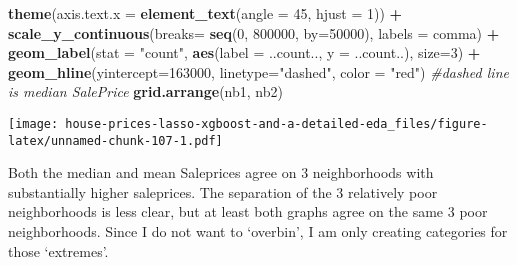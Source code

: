 \documentclass[]{article}
\newenvironment{Shaded}{\begin{snugshade}}{\end{snugshade}}
\newcommand{\KeywordTok}[1]{\textcolor[rgb]{0.13,0.29,0.53}{\textbf{#1}}}
\newcommand{\DataTypeTok}[1]{\textcolor[rgb]{0.13,0.29,0.53}{#1}}
\newcommand{\DecValTok}[1]{\textcolor[rgb]{0.00,0.00,0.81}{#1}}
\newcommand{\StringTok}[1]{\textcolor[rgb]{0.31,0.60,0.02}{#1}}
\newcommand{\CommentTok}[1]{\textcolor[rgb]{0.56,0.35,0.01}{\textit{#1}}}
\newcommand{\OperatorTok}[1]{\textcolor[rgb]{0.81,0.36,0.00}{\textbf{#1}}}
\newcommand{\NormalTok}[1]{#1}
\begin{document}
\begin{Shaded}
\begin{Highlighting}[]
\StringTok{        }\KeywordTok{theme}\NormalTok{(}\DataTypeTok{axis.text.x =} \KeywordTok{element_text}\NormalTok{(}\DataTypeTok{angle =} \DecValTok{45}\NormalTok{, }\DataTypeTok{hjust =} \DecValTok{1}\NormalTok{)) }\OperatorTok{+}
\StringTok{        }\KeywordTok{scale_y_continuous}\NormalTok{(}\DataTypeTok{breaks=} \KeywordTok{seq}\NormalTok{(}\DecValTok{0}\NormalTok{, }\DecValTok{800000}\NormalTok{, }\DataTypeTok{by=}\DecValTok{50000}\NormalTok{), }\DataTypeTok{labels =}\NormalTok{ comma) }\OperatorTok{+}
\StringTok{        }\KeywordTok{geom_label}\NormalTok{(}\DataTypeTok{stat =} \StringTok{"count"}\NormalTok{, }\KeywordTok{aes}\NormalTok{(}\DataTypeTok{label =}\NormalTok{ ..count.., }\DataTypeTok{y =}\NormalTok{ ..count..), }\DataTypeTok{size=}\DecValTok{3}\NormalTok{) }\OperatorTok{+}
\StringTok{        }\KeywordTok{geom_hline}\NormalTok{(}\DataTypeTok{yintercept=}\DecValTok{163000}\NormalTok{, }\DataTypeTok{linetype=}\StringTok{"dashed"}\NormalTok{, }\DataTypeTok{color =} \StringTok{"red"}\NormalTok{) }\CommentTok{#dashed line is median SalePrice}
\KeywordTok{grid.arrange}\NormalTok{(nb1, nb2)}
\end{Highlighting}
\end{Shaded}

\texttt{[image: house-prices-lasso-xgboost-and-a-detailed-eda\_files/figure-latex/unnamed-chunk-107-1.pdf]}

Both the median and mean Saleprices agree on 3 neighborhoods with
substantially higher saleprices. The separation of the 3 relatively poor
neighborhoods is less clear, but at least both graphs agree on the same
3 poor neighborhoods. Since I do not want to `overbin', I am only
creating categories for those `extremes'.

\begin{Shaded}
\end{Shaded}
\end{document}
